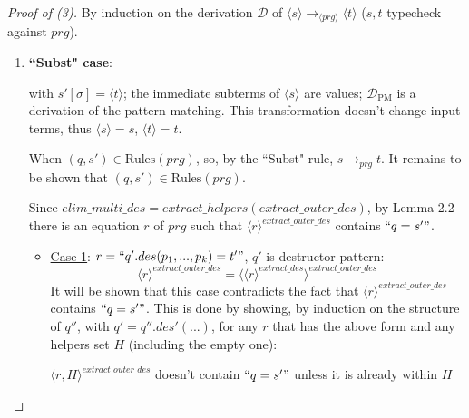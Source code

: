\documentclass[11pt]{article} %
\begin{document}
\begin{proof}[Proof of (3)] By induction on the derivation $\mathcal{D}$ of $\langle s \rangle \longrightarrow_{\langle prg \rangle} \langle t \rangle$ ($s, t$ typecheck against $prg$).

\begin{enumerate}
\item \textbf{``Subst" case}:

\begin{prooftree}
\end{prooftree}

with $s'[\sigma] = \langle t \rangle$; the immediate subterms of $\langle s \rangle$ are values; $\mathcal{D}_{\textrm{PM}}$ is a derivation of the pattern matching. This transformation doesn't change input terms, thus $\langle s \rangle = s$, $\langle t \rangle = t$.

When $(q, s') \in \textrm{Rules}(prg)$, so, by the ``Subst" rule, $s \longrightarrow_{prg} t$. It remains to be shown that $(q, s') \in \textrm{Rules}(prg)$.

Since $elim\_multi\_des = extract\_helpers(extract\_outer\_des)$, by Lemma 2.2 there is an equation $r$ of $prg$ such that $\langle r \rangle^{extract\_outer\_des}$ contains $`` q = s' "$.

\begin{itemize}

\item \underline{Case 1}: $r = `` q'.des(p_1, ..., p_k) = t' "$, $q'$ is destructor pattern:
\begin{equation*}
\langle r \rangle^{extract\_outer\_des} = \langle \langle r \rangle^{extract\_des} \rangle^{extract\_outer\_des}
\end{equation*}
It will be shown that this case contradicts the fact that $\langle r \rangle^{extract\_outer\_des}$ contains $`` q = s' "$. This is done by showing, by induction on the structure of $q''$, with $q' = q''.des'(...)$, for any $r$ that has the above form and any helpers set $H$ (including the empty one):

$\langle r , H \rangle^{extract\_outer\_des}$ doesn't contain $`` q = s' "$ unless it is already within $H$

\begin{enumerate}


\end{enumerate}
\end{itemize}
\end{enumerate}
\end{proof}
\end{document}
